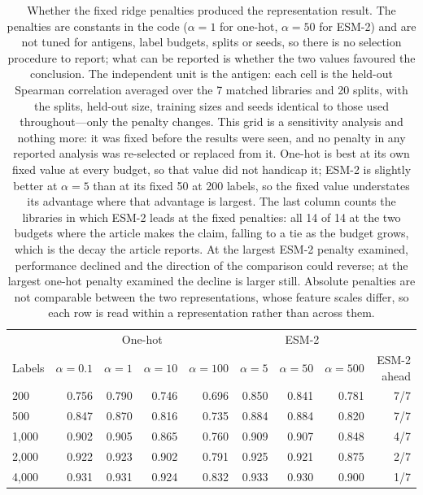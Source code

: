 \documentclass[11pt,a4paper]{article}
\begin{document}
\begin{table}[h]
\caption{Whether the fixed ridge penalties produced the representation result. The penalties are constants in the code ($\alpha = 1$ for one-hot, $\alpha = 50$ for ESM-2) and are not tuned for antigens, label budgets, splits or seeds, so there is no selection procedure to report; what can be reported is whether the two values favoured the conclusion. The independent unit is the antigen: each cell is the held-out Spearman correlation averaged over the 7 matched libraries and 20 splits, with the splits, held-out size, training sizes and seeds identical to those used throughout---only the penalty changes. This grid is a sensitivity analysis and nothing more: it was fixed before the results were seen, and no penalty in any reported analysis was re-selected or replaced from it. One-hot is best at its own fixed value at every budget, so that value did not handicap it; ESM-2 is slightly better at $\alpha = 5$ than at its fixed 50 at 200 labels, so the fixed value understates its advantage where that advantage is largest. The last column counts the libraries in which ESM-2 leads at the fixed penalties: all 14 of 14 at the two budgets where the article makes the claim, falling to a tie as the budget grows, which is the decay the article reports. At the largest ESM-2 penalty examined, performance declined and the direction of the comparison could reverse; at the largest one-hot penalty examined the decline is larger still. Absolute penalties are not comparable between the two representations, whose feature scales differ, so each row is read within a representation rather than across them.}
\label{tab:alpha}
\centering
\vspace{4pt}
\begin{tabular}{@{}lrrrrrrrr@{}}
\toprule
& \multicolumn{4}{c}{One-hot} & \multicolumn{3}{c}{ESM-2} & \\
Labels & $\alpha=0.1$ & $\alpha=1$ & $\alpha=10$ & $\alpha=100$ & $\alpha=5$ & $\alpha=50$ & $\alpha=500$ & ESM-2 ahead \\
\midrule
200 & 0.756 & 0.790 & 0.746 & 0.696 & 0.850 & 0.841 & 0.781 & 7/7 \\
500 & 0.847 & 0.870 & 0.816 & 0.735 & 0.884 & 0.884 & 0.820 & 7/7 \\
1,000 & 0.902 & 0.905 & 0.865 & 0.760 & 0.909 & 0.907 & 0.848 & 4/7 \\
2,000 & 0.922 & 0.923 & 0.902 & 0.791 & 0.925 & 0.921 & 0.875 & 2/7 \\
4,000 & 0.931 & 0.931 & 0.924 & 0.832 & 0.933 & 0.930 & 0.900 & 1/7 \\
\bottomrule
\end{tabular}
\end{table}
\end{document}
